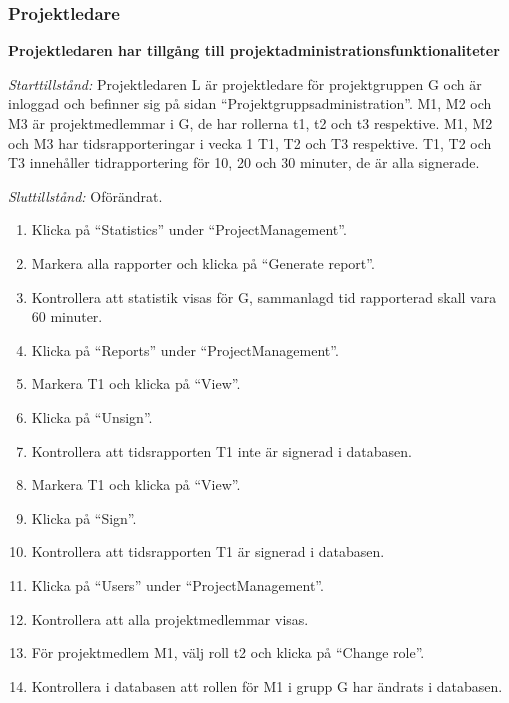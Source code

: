 \documentclass[a4paper]{article}
\begin{document}
\subsubsection{Projektledare}
\begin{ST}
\item \textbf{Projektledaren har tillgång till projektadministrationsfunktionaliteter}

\emph{Starttillstånd:} Projektledaren L är projektledare för projektgruppen G och är inloggad och befinner sig på sidan ``Projektgruppsadministration''. M1, M2 och M3 är projektmedlemmar i G, de har rollerna t1, t2 och t3 respektive. M1, M2 och M3 har tidsrapporteringar i vecka 1 T1, T2 och T3 respektive. T1, T2 och T3 innehåller tidrapportering för 10, 20 och 30 minuter, de är alla signerade.

\emph{Sluttillstånd:} Oförändrat.

\begin{enumerate}
\item Klicka på ``Statistics'' under ``ProjectManagement''.
\item Markera alla rapporter och klicka på ``Generate report''.
\item Kontrollera att statistik visas för G, sammanlagd tid rapporterad skall vara 60 minuter.
\item Klicka på ``Reports'' under ``ProjectManagement''.
\item Markera T1 och klicka på ``View''.
\item Klicka på ``Unsign''.
\item Kontrollera att tidsrapporten T1 inte är signerad i databasen.
\item Markera T1 och klicka på ``View''.
\item Klicka på ``Sign''.
\item Kontrollera att tidsrapporten T1 är signerad i databasen.
\item Klicka på ``Users'' under ``ProjectManagement''.
\item Kontrollera att alla projektmedlemmar visas.
\item För projektmedlem M1, välj roll t2 och klicka på ``Change role''.
\item Kontrollera i databasen att rollen för M1 i grupp G har ändrats i databasen.
\end{enumerate}
\end{ST}
\end{document}
